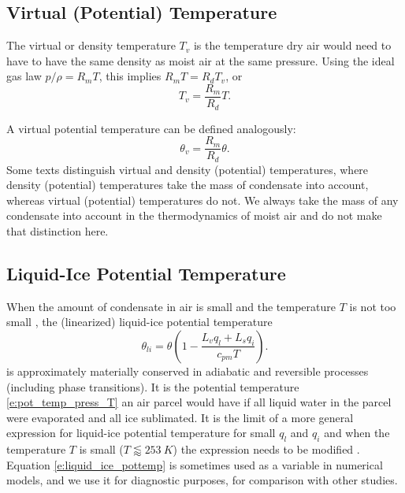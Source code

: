 \documentclass{report}
\begin{document}
\subsection{Virtual (Potential) Temperature} The virtual or density temperature $T_v$ is the temperature dry air would need to have to have the same density as moist air at the same pressure. Using the ideal gas law $p/\rho = R_m T$, this implies $R_m T  = R_d T_v $, or
\begin{equation}\label{e:virtual_temp}
T_v = \frac{R_m}{R_d} T.
\end{equation}

A virtual potential temperature can be defined analogously:
\begin{equation}\label{e:virtual_pottemp}
\theta_v = \frac{R_m}{R_d} \theta.
\end{equation}
Some texts distinguish virtual and density (potential) temperatures, where density (potential) temperatures take the mass of condensate into account, whereas virtual (potential) temperatures do not. We always take the mass of any condensate into account in the thermodynamics of moist air and do not make that distinction here. 

\subsection{Liquid-Ice Potential Temperature}

When the amount of condensate in air is small and the temperature $T$ is not too small \citep[e.g.,][]{Tripoli81}, the (linearized) liquid-ice potential temperature
\begin{equation}\label{e:liquid_ice_pottemp}
\theta_{li} = \theta \left( 1 - \frac{L_v q_l + L_s q_i}{c_{pm} T} \right).
\end{equation}
is approximately materially conserved in adiabatic and reversible processes (including phase transitions). It is the potential temperature \eqref{e:pot_temp_press_T} an air parcel would have if all liquid water in the parcel were evaporated and all ice sublimated. It is the limit of a more general expression for liquid-ice potential temperature for small $q_l$ and $q_i$ \citep[e.g.,][]{Bryan04a} and when the temperature $T$ is small ($T \lessapprox 253~K$) the expression needs to be modified \citep{Tripoli81}. Equation \eqref{e:liquid_ice_pottemp} is sometimes used as a variable in numerical models, and we use it for diagnostic purposes, for comparison with other studies.
\end{document}
